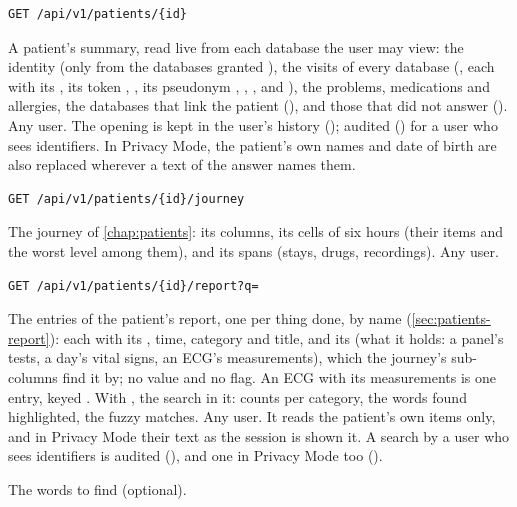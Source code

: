 \begin{lstlisting}[style=signature]
GET /api/v1/patients/{id}
\end{lstlisting}
A patient's summary, read live from each database the user may view: the identity (only from
the databases granted ), the visits of every database (, each with its
, its token , , its pseudonym
, , ,  and ), the problems,
medications and allergies, the databases that link the patient (), and those that
did not answer (). Any user. The opening is kept in the user's history
(); audited () for a user who sees identifiers.
In Privacy Mode, the patient's own names and date of birth are also replaced wherever a text
of the answer names them.

\begin{lstlisting}[style=signature]
GET /api/v1/patients/{id}/journey
\end{lstlisting}
The journey of \cref{chap:patients}: its columns, its cells of six hours (their items and the
worst level among them), and its spans (stays, drugs, recordings). Any user.

\begin{lstlisting}[style=signature]
GET /api/v1/patients/{id}/report?q=
\end{lstlisting}
The entries of the patient's report, one per thing done, by name (\cref{sec:patients-report}):
each with its , time, category and title, and its  (what it holds: a
panel's tests, a day's vital signs, an ECG's measurements), which the journey's sub-columns find
it by; no value and no flag. An ECG with its measurements is one entry, keyed
. With , the search in it: counts per category,
the words found highlighted, the fuzzy matches. Any user. It reads the patient's own items
only, and in Privacy Mode their text as the session is shown it. A search by a user who sees
identifiers is audited (), and one in Privacy Mode too
().
\begin{params}
\item[q] The words to find (optional).
\end{params}


